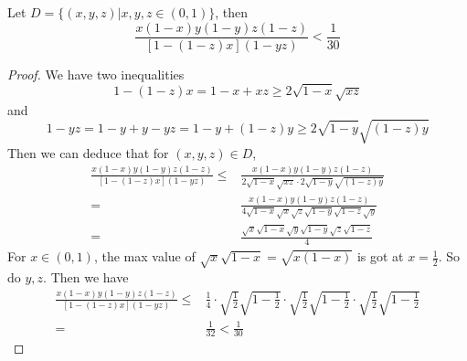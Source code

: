 \begin{lemma}\label{bound}
    Let $D = \{(x,y,z)|x,y,z\in (0,1)\}$, then
    \[ \frac{x(1-x)y(1-y)z(1-z)}{[1-(1-z)x](1-yz)} < \frac{1}{30} \]
\end{lemma}
\begin{proof}
    \leanok
    We have two inequalities
    \[ 1-(1-z)x = 1-x+xz \geqslant 2\sqrt{1-x}\sqrt{xz} \]
    and
    \[ 1-yz= 1-y+y-yz = 1-y+(1-z)y \geqslant 2\sqrt{1-y}\sqrt{(1-z)y} \]
    Then we can deduce that for $(x,y,z) \in D$,
    \begin{align*}
        \frac{x(1-x)y(1-y)z(1-z)}{[1-(1-z)x](1-yz)} \leqslant& \frac{x(1-x)y(1-y)z(1-z)}{2\sqrt{1-x}\sqrt{xz}\cdot2\sqrt{1-y}\sqrt{(1-z)y}}\\
        =&\frac{x(1-x)y(1-y)z(1-z)}{4\sqrt{1-x}\sqrt{x}\sqrt{z}\sqrt{1-y}\sqrt{1-z}\sqrt{y}}\\
        =&\frac{\sqrt{x}\sqrt{1-x}\sqrt{y}\sqrt{1-y}\sqrt{z}\sqrt{1-z}}{4}
    \end{align*}
    For $x\in (0,1)$, the max value of $\sqrt{x}\sqrt{1-x} = \sqrt{x(1-x)}$ is got at $x=\frac{1}{2}$. So do $y, z$.
    Then we have
    \begin{align*}
        \frac{x(1-x)y(1-y)z(1-z)}{[1-(1-z)x](1-yz)} \leqslant& \frac{1}{4}\cdot\sqrt{\frac{1}{2}}\sqrt{1-\frac{1}{2}}\cdot\sqrt{\frac{1}{2}}\sqrt{1-\frac{1}{2}}\cdot\sqrt{\frac{1}{2}}\sqrt{1-\frac{1}{2}} \\
        =& \frac{1}{32} < \frac{1}{30} 
    \end{align*}
\end{proof}

